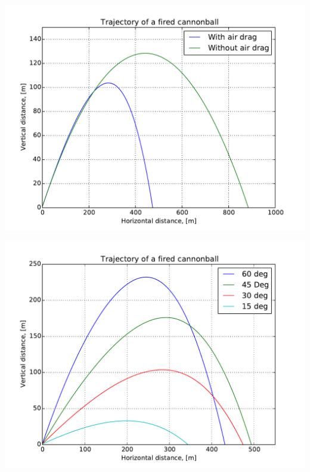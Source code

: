 \documentclass[english, 12pt]{beamer}
\begin{document}
\begin{frame}[fragile]
\begin{center}
	\includegraphics[width=\textwidth]{fig/plot_cannonball2}
\end{center}
\end{frame}

\begin{frame}[fragile]
\begin{center}
	\includegraphics[width=\textwidth]{fig/plot_cannonball3}
\end{center}
\end{frame}
\end{document}
